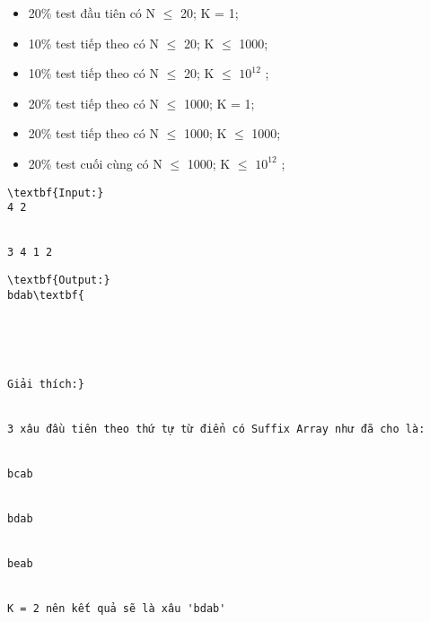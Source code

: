 \begin{itemize}
	\item     20\% test đầu tiên có N  $\le$  20; K = 1;   
	\item     10\% test tiếp theo có N  $\le$  20; K  $\le$  1000;   
	\item     10\% test tiếp theo có N  $\le$  20; K  $\le$  $10^{12}$    ;   
	\item     20\% test tiếp theo có N  $\le$  1000; K = 1;   
	\item     20\% test tiếp theo có N  $\le$  1000; K  $\le$ 1000;   
	\item     20\% test cuối cùng có N  $\le$  1000; K  $\le$  $10^{12}$    ;   
\end{itemize}
\begin{verbatim}
\textbf{Input:}
4 2


3 4 1 2\end{verbatim}
\begin{verbatim}
\textbf{Output:}
bdab\textbf{





Giải thích:}


3 xâu đầu tiên theo thứ tự từ điển có Suffix Array như đã cho là:


bcab


bdab


beab


K = 2 nên kết quả sẽ là xâu 'bdab' \end{verbatim}